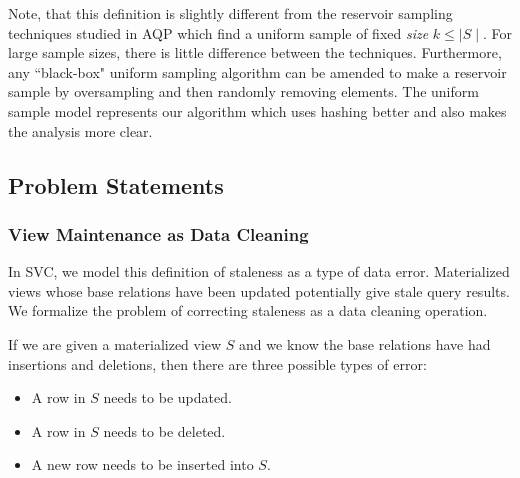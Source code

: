 Note, that this definition is slightly different from the reservoir sampling techniques studied in AQP which find a uniform
sample of fixed \emph{size} $k\le \mid S \mid$.
For large sample sizes, there is little difference between the techniques.
Furthermore, any ``black-box" uniform sampling algorithm can be amended to make a reservoir sample by oversampling and then randomly removing elements.
The uniform sample model represents our algorithm which uses hashing better and also makes the analysis more clear.

\subsection{Problem Statements}
\subsubsection{View Maintenance as Data Cleaning}
In SVC, we model this definition of staleness as a type of data error.
Materialized views whose base relations have been updated potentially give stale query results.
We formalize the problem of correcting staleness as a data cleaning operation.

If we are given a materialized view $S$ and we know the base relations have had insertions and deletions, then there are three possible types of error:
\begin{itemize}
\item A row in $S$ needs to be updated.
\item A row in $S$ needs to be deleted.
\item A new row needs to be inserted into $S$.
\end{itemize}

